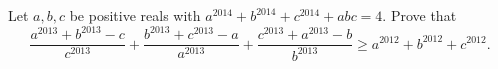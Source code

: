 Let $a, b, c$ be positive reals with $a^{2014}+b^{2014}+c^{2014}+abc=4$. Prove that
\[ \frac{a^{2013}+b^{2013}-c}{c^{2013}} + \frac{b^{2013}+c^{2013}-a}{a^{2013}} + \frac{c^{2013}+a^{2013}-b}{b^{2013}} \ge a^{2012}+b^{2012}+c^{2012}. \]